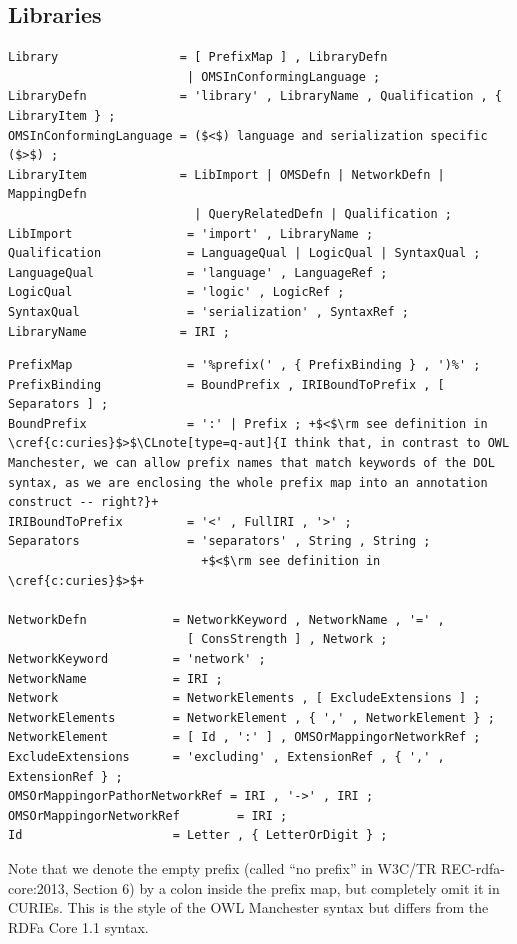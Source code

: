 \documentclass[10pt,fleqn,%
\ifpretendfinal
final%
\else
draft%
\fi,
]{scrreprt}
\makeatletter
\newcommand*\CommentAuthor{}
\renewcommand*\CommentAuthor{#1}}
\newcommand*\CommentDate{}
\renewcommand*\CommentDate{#1}}
\newcommand*\CommentId{}
\renewcommand*\CommentId{#1}}
\newcommand*\CommentType{}
\renewcommand*\CommentType{#1}}
\newcommand*{\SetCommentColorByType}[1]{%
\edef\localType{{#1}}%
\expandafter\ifstrequal\localType{q-aut}{\colorlet{CommentColor}{red}}{%
\expandafter\ifstrequal\localType{q-all}{\colorlet{CommentColor}{orange}}{%
\expandafter\ifstrequal\localType{todo}{\colorlet{CommentColor}{orange}}{%
\expandafter\ifstrequal\localType{fyi}{\colorlet{CommentColor}{lightgray}}{%
\colorlet{CommentColor}{yellow}}}}}}
\newcommand*{\SetCommentPrefixByType}[1]{%
\edef\localType{{#1}}%
\expandafter\@ifmtarg\localType{%
\edef\CommentPrefix{}%
}{%
\caseupper[q]{#1}%
\edef\CommentPrefix{\thestring: }%
}}
\newcommand*{\initComment}[1]{%
\setkeys{Comment}{#1}%
\SetCommentColorByType{\CommentType}%
\relax%
\SetCommentPrefixByType{\CommentType}%
\relax%
}
\newcommand*{\todonote}[2][]{%
\initComment{#1}%
\pdfcomment[author=\CommentAuthor,color=CommentColor,date=\CommentDate,id=\CommentId]{%
\CommentPrefix
#2}}
\renewcommand*{\todonote}[2][]{%
\initComment{#1}%
\ednote{\CommentPrefix #2}}
\newcommand*{\CLnote}[2][author=Christoph Lange]{%
\todonote[author=Christoph Lange,#1]{#2} 
}
\newcommand{\clauserefname}{clause}
\newcommand{\cref}[1]{\clauserefname~\ref{#1}}
\newcommand{\ssclause}[1]{\subsection{#1}}
\newcommand{\nisref}[1]{#1}
\makeatother
\begin{document}
\ssclause{Libraries}

\begin{lstlisting}[language=ebnf,escapeinside={()},morecomment={[l]{\%\%\ }}]
Library                 = [ PrefixMap ] , LibraryDefn
                         | OMSInConformingLanguage ;
LibraryDefn             = 'library' , LibraryName , Qualification , { LibraryItem } ;
OMSInConformingLanguage = ($<$) language and serialization specific ($>$) ;
LibraryItem             = LibImport | OMSDefn | NetworkDefn | MappingDefn 
                          | QueryRelatedDefn | Qualification ;
LibImport                = 'import' , LibraryName ;
Qualification            = LanguageQual | LogicQual | SyntaxQual ;
LanguageQual             = 'language' , LanguageRef ;
LogicQual                = 'logic' , LogicRef ;
SyntaxQual               = 'serialization' , SyntaxRef ;
LibraryName             = IRI ;
\end{lstlisting}

\begin{lstlisting}[language=ebnf,escapechar=+,morecomment={[l]{\%\%\ }}]
PrefixMap                = '%prefix(' , { PrefixBinding } , ')%' ;
PrefixBinding            = BoundPrefix , IRIBoundToPrefix , [ Separators ] ;
BoundPrefix              = ':' | Prefix ; +$<$\rm see definition in \cref{c:curies}$>$\CLnote[type=q-aut]{I think that, in contrast to OWL Manchester, we can allow prefix names that match keywords of the DOL syntax, as we are enclosing the whole prefix map into an annotation construct -- right?}+ 
IRIBoundToPrefix         = '<' , FullIRI , '>' ;
Separators               = 'separators' , String , String ;
                           +$<$\rm see definition in \cref{c:curies}$>$+

NetworkDefn            = NetworkKeyword , NetworkName , '=' , 
                         [ ConsStrength ] , Network ;
NetworkKeyword         = 'network' ;
NetworkName            = IRI ;
Network                = NetworkElements , [ ExcludeExtensions ] ;
NetworkElements        = NetworkElement , { ',' , NetworkElement } ;
NetworkElement         = [ Id , ':' ] , OMSOrMappingorNetworkRef ;
ExcludeExtensions      = 'excluding' , ExtensionRef , { ',' , ExtensionRef } ;
OMSOrMappingorPathorNetworkRef = IRI , '->' , IRI ;
OMSOrMappingorNetworkRef        = IRI ;
Id                     = Letter , { LetterOrDigit } ;
\end{lstlisting}

Note that we denote the empty prefix (called ``no prefix'' in \nisref{W3C/TR REC-rdfa-core:2013, Section 6}) by a colon inside the prefix map, but completely omit it in CURIEs.  This is the style of the OWL Manchester syntax \cite{W3C:NOTE-owl2-manchester-syntax-20091027} but differs from the RDFa Core 1.1 syntax.
\end{document}
